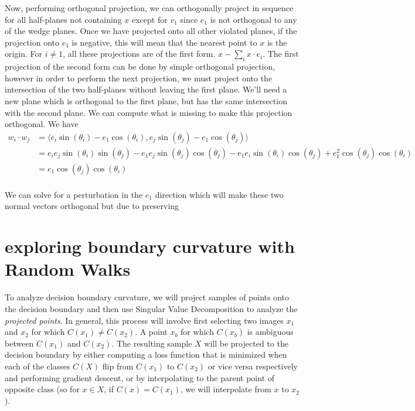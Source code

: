 Now, performing orthogonal projection,
we can orthogonally project in sequence for all half-planes not
containing $x$ except for $v_1$ since $e_1$ is not orthogonal to any
of the wedge planes. Once we have projected onto all other violated
planes, if the projection onto $e_1$ is negative, this will mean that
the nearest point to $x$ is the origin. For $i \neq 1$, all these
projections are of the first form. $x - \sum_{i} x \cdot e_i$. The
first projection of the second form can be done by simple orthogonal
projection, however in order to perform the next projection, we must
project onto the intersection of the two half-planes without leaving
the first plane. We'll need a new plane which is orthogonal to the
first plane, but has the same intersection with the second plane. We
can compute what is missing to make this projection orthogonal. We
have
\begin{align}
  w_i \cdot w_j &= \langle e_i \sin(\theta_i) - e_1 \cos(\theta_i), e_j
                  \sin(\theta_j) - e_1 \cos(\theta_j)\rangle\\
                &= e_ie_j\sin(\theta_i)\sin(\theta_j) -
                  e_1e_j\sin(\theta_j)\cos(\theta_j) - e_1e_i
                  \sin(\theta_i)\cos(\theta_j) +
                  e_1^2\cos(\theta_j)\cos(\theta_i)\\
                &= e_1 \cos(\theta_j)\cos(\theta_i)\\
\end{align}

We can solve for a perturbation in the $e_1$ direction which will make
these two normal vectors orthogonal but due to preserving 




\section{exploring boundary curvature with Random Walks}

To analyze decision boundary curvature, we will project samples of points onto the decision boundary and then use Singular Value Decomposition to analyze the \emph{projected points}. In general, this process will involve first selecting two images $x_1$ and $x_2$ for which $C(x_1) \neq C(x_2)$. A point $x_b$ for which $C(x_b)$ is ambiguous between $C(x_1)$ and $C(x_2)$. The resulting sample $X$ will be projected to the decision boundary by either computing a loss function that is minimized when each of the classes $C(X)$ flip from $C(x_1)$ to $C(x_2)$ or vice versa respectively and performing gradient descent, or by interpolating to the parent point of opposite class (so for $x \in X$, if $C(x) = C(x_1)$, we will interpolate from $x$ to $x_2$). 

